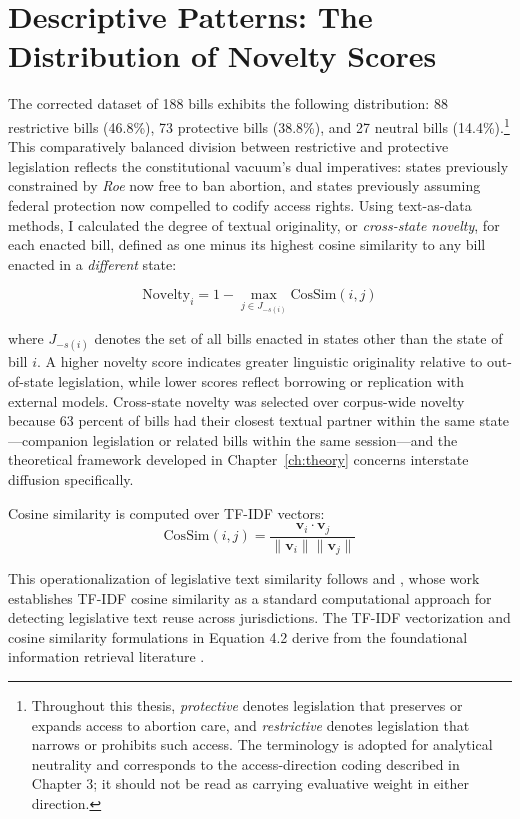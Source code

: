 \section{Descriptive Patterns: The Distribution of Novelty Scores}
\label{sec:descriptive}
The corrected dataset of 188 bills exhibits the following distribution: 88 restrictive bills (46.8\%), 73 protective bills (38.8\%), and 27 neutral bills (14.4\%).\footnote{Throughout this thesis, \textit{protective} denotes legislation that preserves or expands access to abortion care, and \textit{restrictive} denotes legislation that narrows or prohibits such access. The terminology is adopted for analytical neutrality and corresponds to the access-direction coding described in Chapter 3; it should not be read as carrying evaluative weight in either direction.} This comparatively balanced division between restrictive and protective legislation reflects the constitutional vacuum's dual imperatives: states previously constrained by \emph{Roe} now free to ban abortion, and states previously assuming federal protection now compelled to codify access rights. Using text-as-data methods, I calculated the degree of textual originality, or \textit{cross-state novelty}, for each enacted bill, defined as one minus its highest cosine similarity to any bill enacted in a \textit{different} state:

\begin{equation}
\text{Novelty}_i = 1 - \max_{j \in J_{-s(i)}} \text{CosSim}(i, j)
\label{eq:novelty}
\end{equation}

\noindent where $J_{-s(i)}$ denotes the set of all bills enacted in states other than the state of bill $i$. A higher novelty score indicates greater linguistic originality relative to out-of-state legislation, while lower scores reflect borrowing or replication with external models. Cross-state novelty was selected over corpus-wide novelty because 63 percent of bills had their closest textual partner within the same state---companion legislation or related bills within the same session---and the theoretical framework developed in Chapter~\ref{ch:theory} concerns interstate diffusion specifically.

Cosine similarity is computed over TF-IDF vectors:
\begin{equation}
\text{CosSim}(i, j) = \frac{\mathbf{v}_i \cdot \mathbf{v}_j}{\|\mathbf{v}_i\| \|\mathbf{v}_j\|}
\label{eq:cossim}
\end{equation}

This operationalization of legislative text similarity follows \textcite{wilkersonTracingFlowPolicy2015} and \textcite{linderTextPolicyMeasuring2020}, whose work establishes TF-IDF cosine similarity as a standard computational approach for detecting legislative text reuse across jurisdictions. The TF-IDF vectorization and cosine similarity formulations in Equation 4.2 derive from the foundational information retrieval literature \parencite{saltonIntroductionModernInformation1987,jurafskymartinspeechlangprocess2026}.

